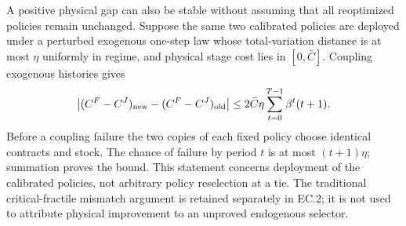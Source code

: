 A positive physical gap can also be stable without assuming that all reoptimized policies remain unchanged. Suppose the same two calibrated policies are deployed under a perturbed exogenous one-step law whose total-variation distance is at most $\eta$ uniformly in regime, and physical stage cost lies in $[0,\bar C]$. Coupling exogenous histories gives
\begin{equation}\label{eq:robust}
 \left|(C^F-C^J)_{\rm new}-(C^F-C^J)_{\rm old}\right|
 \leq 2\bar C\eta\sum_{t=0}^{T-1}\beta^t(t+1).
\end{equation}
Before a coupling failure the two copies of each fixed policy choose identical contracts and stock. The chance of failure by period $t$ is at most $(t+1)\eta$; summation proves the bound. This statement concerns deployment of the calibrated policies, not arbitrary policy reselection at a tie. The traditional critical-fractile mismatch argument is retained separately in EC.2; it is not used to attribute physical improvement to an unproved endogenous selector.


